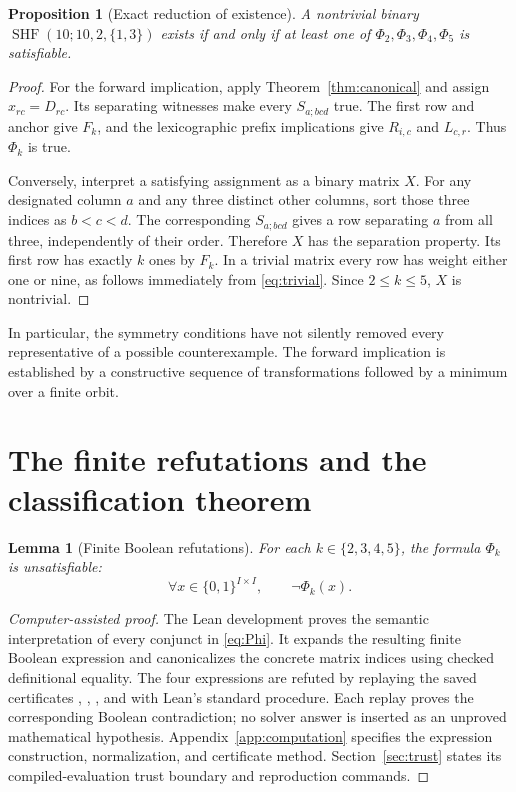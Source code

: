 \documentclass[11pt]{article}
\newtheorem{lemma}[theorem]{Lemma}
\newtheorem{proposition}[theorem]{Proposition}
\theoremstyle{definition}
\theoremstyle{remark}
\newcommand{\bits}{\{0,1\}}
\newcommand{\I}{I}
\newcommand{\shf}{\operatorname{SHF}}
\begin{document}
\begin{proposition}[Exact reduction of existence]
\label{prop:exact}
A nontrivial binary $\shf(10;10,2,\{1,3\})$ exists if and only if at
least one of $\Phi_2,\Phi_3,\Phi_4,\Phi_5$ is satisfiable.
\end{proposition}
\begin{proof}
For the forward implication, apply Theorem~\ref{thm:canonical} and
assign $x_{rc}=D_{rc}$. Its separating witnesses make every
$S_{a;bcd}$ true. The first row and anchor give $F_k$, and the
lexicographic prefix implications give $R_{i,c}$ and $L_{c,r}$.
Thus $\Phi_k$ is true.

Conversely, interpret a satisfying assignment as a binary matrix $X$.
For any designated column $a$ and any three distinct other columns,
sort those three indices as $b<c<d$. The corresponding
$S_{a;bcd}$ gives a row separating $a$ from all three, independently
of their order. Therefore $X$ has the separation property. Its first
row has exactly $k$ ones by $F_k$. In a trivial matrix every row has
weight either one or nine, as follows immediately from
\eqref{eq:trivial}. Since $2\leq k\leq5$, $X$ is nontrivial.
\end{proof}

In particular, the symmetry conditions have not silently removed every
representative of a possible counterexample. The forward implication
is established by a constructive sequence of transformations followed
by a minimum over a finite orbit.

\section{The finite refutations and the classification theorem}
\label{sec:finite-check}

\begin{lemma}[Finite Boolean refutations]
\label{lem:finite-unsat}
For each $k\in\{2,3,4,5\}$, the formula $\Phi_k$ is unsatisfiable:
\begin{equation}
\label{eq:finite-unsat}
 \forall x\in\bits^{\I\times\I},\qquad\neg\Phi_k(x).
\end{equation}
\end{lemma}
\begin{proof}[Computer-assisted proof]
The Lean development proves the semantic interpretation of every
conjunct in \eqref{eq:Phi}. It expands the resulting finite Boolean
expression and canonicalizes the concrete matrix indices using
checked definitional equality. The four expressions are refuted by
replaying the saved certificates
,
,
, and
 with Lean's standard 
procedure. Each replay proves the corresponding Boolean contradiction;
no solver answer is inserted as an unproved mathematical hypothesis.
Appendix~\ref{app:computation} specifies the expression construction,
normalization, and certificate method. Section~\ref{sec:trust} states
its compiled-evaluation trust boundary and reproduction commands.
\end{proof}
\end{document}

